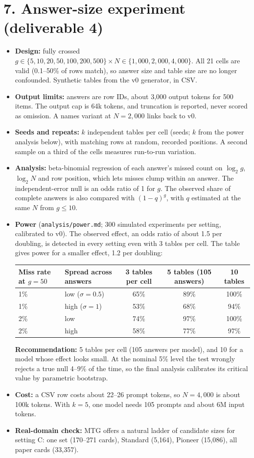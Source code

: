 \documentclass[10pt]{article}
\begin{document}
\section*{7. Answer-size experiment (deliverable 4)}
\begin{itemize}
\item \textbf{Design:} fully crossed $g \in \{5, 10, 20, 50, 100, 200, 500\} \times N \in \{1{,}000, 2{,}000,
4{,}000\}$. All 21 cells are valid (0.1--50\% of rows match), so answer size and table size are no longer
confounded. Synthetic tables from the v0 generator, in CSV.
\item \textbf{Output limits:} answers are row IDs, about 3,000 output tokens for 500 items. The output cap is 64k
tokens, and truncation is reported, never scored as omission. A names variant at $N = 2{,}000$ links back to v0.
\item \textbf{Seeds and repeats:} $k$ independent tables per cell (seeds; $k$ from the power analysis below), with matching rows at random, recorded
positions. A second sample on a third of the cells measures run-to-run variation.
\item \textbf{Analysis:} beta-binomial regression of each answer's missed count on $\log_2 g$, $\log_2 N$ and row
position, which lets misses clump within an answer. The independent-error null is an odds ratio of 1 for $g$. The
observed share of complete answers is also compared with $(1-q)^g$, with $q$ estimated at the same $N$ from
$g \le 10$.
\item \textbf{Power} (\texttt{analysis/power.md}; 300 simulated experiments per setting, calibrated to v0). The
observed effect, an odds ratio of about 1.5 per doubling, is detected in every setting even with 3 tables per
cell. The table gives power for a smaller effect, 1.2 per doubling:\par
{\small\begin{tabular}{@{}llccc@{}}
\toprule
Miss rate at $g = 50$ & Spread across answers & 3 tables per cell & 5 tables (105 answers) & 10 tables \\
\midrule
1\% & low ($\sigma = 0.5$) & 65\% & 89\% & 100\% \\
1\% & high ($\sigma = 1$) & 53\% & 68\% & 94\% \\
2\% & low & 74\% & 97\% & 100\% \\
2\% & high & 58\% & 77\% & 97\% \\
\bottomrule
\end{tabular}}\par
\textbf{Recommendation:} 5 tables per cell (105 answers per model), and 10 for a model whose effect looks small. At
the nominal 5\% level the test wrongly rejects a true null 4--9\% of the time, so the final analysis calibrates its
critical value by parametric bootstrap.
\item \textbf{Cost:} a CSV row costs about 22--26 prompt tokens, so $N = 4{,}000$ is about 100k tokens. With
$k = 5$, one model needs 105 prompts and about 6M input tokens.
\item \textbf{Real-domain check:} MTG offers a natural ladder of candidate sizes for setting C: one set
(170--271 cards), Standard (5,164), Pioneer (15,086), all paper cards (33,357).
\end{itemize}
\end{document}
